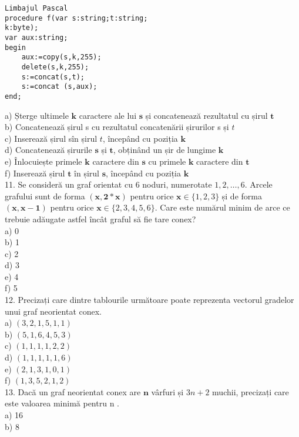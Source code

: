 \begin{verbatim}
Limbajul Pascal
procedure f(var s:string;t:string;
k:byte);
var aux:string;
begin
    aux:=copy(s,k,255);
    delete(s,k,255);
    s:=concat(s,t);
    s:=concat (s,aux);
end;
\end{verbatim}

a) Șterge ultimele $\mathbf{k}$ caractere ale lui $\mathbf{s}$ și concatenează rezultatul cu șirul $\mathbf{t}$\\
b) Concatenează șirul s cu rezultatul concatenării șirurilor s și $t$\\
c) Inserează șirul sîn șirul $t$, începând cu poziția $\mathbf{k}$\\
d) Concatenează șirurile $\mathbf{s}$ și $\mathbf{t}$, obținând un șir de lungime $\mathbf{k}$\\
e) Înlocuiește primele $\mathbf{k}$ caractere din $\mathbf{s}$ cu primele $\mathbf{k}$ caractere din $\mathbf{t}$\\
f) Inserează șirul $\mathbf{t}$ în șirul $\mathbf{s}$, începând cu poziția $\mathbf{k}$\\
11. Se consideră un graf orientat cu 6 noduri, numerotate $1,2, \ldots, 6$. Arcele grafului sunt de forma $(\mathbf{x}, \mathbf{2 *} \mathbf{x})$ pentru orice $\mathbf{x} \in\{1,2,3\}$ și de forma $(\mathbf{x}, \mathbf{x}-\mathbf{1})$ pentru orice $\mathbf{x} \in\{2,3,4,5,6\}$. Care este numărul minim de arce ce trebuie adăugate astfel încât graful să fie tare conex?\\
a) 0\\
b) 1\\
c) 2\\
d) 3\\
e) 4\\
f) 5\\
12. Precizați care dintre tablourile următoare poate reprezenta vectorul gradelor unui graf neorientat conex.\\
a) $(3,2,1,5,1,1)$\\
b) $(5,1,6,4,5,3)$\\
c) $(1,1,1,1,2,2)$\\
d) $(1,1,1,1,1,6)$\\
e) $(2,1,3,1,0,1)$\\
f) $(1,3,5,2,1,2)$\\
13. Dacă un graf neorientat conex are $\mathbf{n}$ vârfuri și $3 n+2$ muchii, precizați care este valoarea minimă pentru n .\\
a) 16\\
b) 8\\
